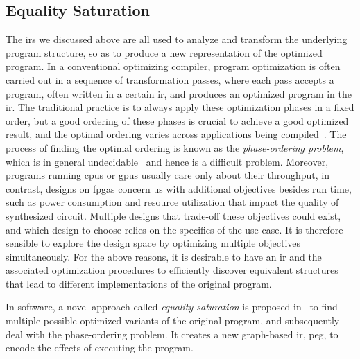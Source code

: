 \subsection{Equality Saturation}
\label{bg:sub:equality_saturation}

The \glspl{ir} we discussed above are all used to analyze and transform the
underlying program structure, so as to produce a new representation of the
optimized program.  In a conventional optimizing compiler, program optimization
is often carried out in a sequence of transformation passes, where each pass
accepts a program, often written in a certain \gls{ir}, and produces an
optimized program in the \gls{ir}\@.  The traditional practice is to always
apply these optimization phases in a fixed order, but a good ordering of these
phases is crucial to achieve a good optimized result, and the optimal ordering
varies across applications being compiled~\cite{almagor04}.  The process of
finding the optimal ordering is known as the \emph{phase-ordering problem},
which is in general undecidable~\cite{touati06} and hence is a difficult
problem.  Moreover, programs running \glspl{cpu} or \glspl{gpu} usually care
only about their throughput, in contrast, designs on \glspl{fpga} concern us
with additional objectives besides run time, such as power consumption and
resource utilization that impact the quality of synthesized circuit.  Multiple
designs that trade-off these objectives could exist, and which design to
choose relies on the specifics of the use case.  It is therefore sensible to
explore the design space by optimizing multiple objectives simultaneously.
For the above reasons, it is desirable to have an \gls{ir} and the associated
optimization procedures to efficiently discover equivalent structures that lead
to different implementations of the original program.

In software, a novel approach called \emph{equality saturation} is proposed
in~\cite{tate09} to find multiple possible optimized variants of the original
program, and subsequently deal with the phase-ordering problem.  It creates a
new graph-based \gls{ir}, \gls{peg}, to encode the effects of executing the
program.

